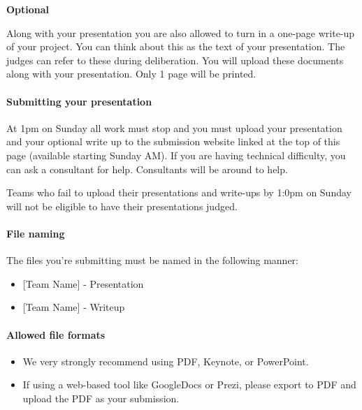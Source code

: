 \documentclass[]{article}
\providecommand{\tightlist}{%
  \setlength{\itemsep}{0pt}\setlength{\parskip}{0pt}}
\let\oldparagraph\paragraph
\renewcommand{\paragraph}[1]{\oldparagraph{#1}\mbox{}}
\begin{document}
\textbf{Optional}

Along with your presentation you are also allowed to turn in a one-page
write-up of your project. You can think about this as the text of your
presentation. The judges can refer to these during deliberation. You
will upload these documents along with your presentation. Only 1 page
will be printed.

\hypertarget{submitting-your-presentation}{%
\paragraph{Submitting your
presentation}\label{submitting-your-presentation}}

At 1pm on Sunday all work must stop and you must upload your
presentation and your optional write up to the submission website linked
at the top of this page (available starting Sunday AM). If you are
having technical difficulty, you can ask a consultant for help.
Consultants will be around to help.

Teams who fail to upload their presentations and write-ups by 1:0pm on
Sunday will not be eligible to have their presentations judged.

\hypertarget{file-naming}{%
\paragraph{File naming}\label{file-naming}}

The files you're submitting must be named in the following manner:

\begin{itemize}
\tightlist
\item
  {[}Team Name{]} - Presentation
\item
  {[}Team Name{]} - Writeup
\end{itemize}

\hypertarget{allowed-file-formats}{%
\paragraph{Allowed file formats}\label{allowed-file-formats}}

\begin{itemize}
\tightlist
\item
  We very strongly recommend using PDF, Keynote, or PowerPoint.
\item
  If using a web-based tool like GoogleDocs or Prezi, please export to
  PDF and upload the PDF as your submission.
\end{itemize}
\end{document}
